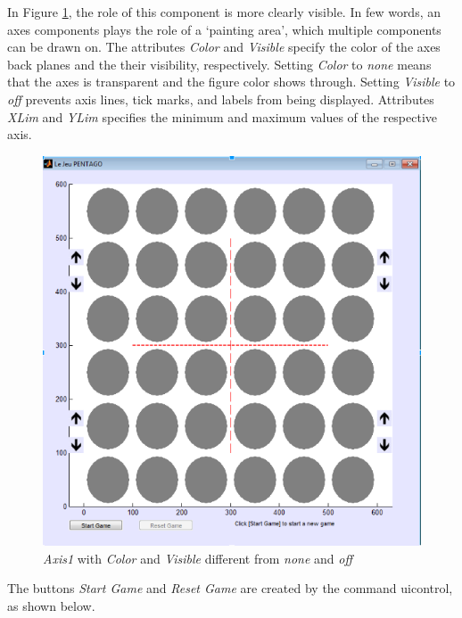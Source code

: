 \vspace{10pt}

In Figure \ref{fig:noeffects}, the role of this component is more clearly
visible. In few words, an axes components plays the role of a ‘painting area’,
which multiple components can be drawn on. The attributes \textit{Color} and
\textit{Visible} specify the color of the axes back planes and the their
visibility, respectively. Setting \textit{Color} to \textit{none} means that the
axes is transparent and the figure color shows through. Setting \textit{Visible}
to \textit{off} prevents axis lines, tick marks, and labels from being
displayed. Attributes \textit{XLim} and \textit{YLim} specifies the minimum and
maximum values of the respective axis.

\begin{figure}[h]
\centering
\includegraphics[scale=.43]{images/noeffects}
\caption{\textit{Axis1} with \textit{Color} and \textit{Visible} 
different from \textit{none} and \textit{off}}
\label{fig:noeffects}
\end{figure}

\FloatBarrier

The buttons \textit{Start Game} and \textit{Reset Game} are created by the
command uicontrol, as shown below.

\vspace{10pt}

